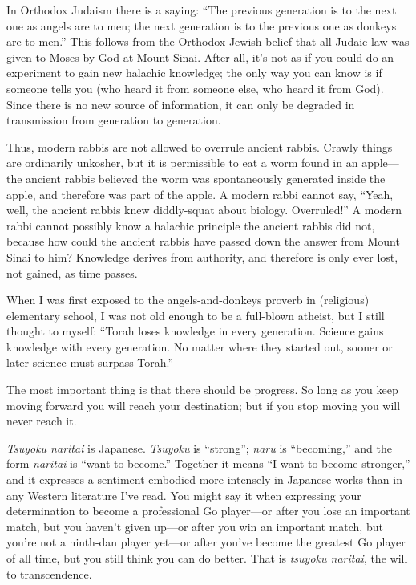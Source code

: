 
{
 In Orthodox Judaism there is a saying: ``The
previous generation is to the next one as angels are to men; the next
generation is to the previous one as donkeys are to
men.'' This follows from the Orthodox Jewish belief
that all Judaic law was given to Moses by God at Mount Sinai. After
all, it's not as if you could do an experiment to gain
new halachic knowledge; the only way you can know is if someone tells
you (who heard it from someone else, who heard it from God). Since
there is no new source of information, it can only be degraded in
transmission from generation to generation. }

{
 Thus, modern rabbis are not allowed to overrule ancient rabbis.
Crawly things are ordinarily unkosher, but it is permissible to eat a
worm found in an apple---the ancient rabbis believed the worm was
spontaneously generated inside the apple, and therefore was part of the
apple. A modern rabbi cannot say, ``Yeah, well, the
ancient rabbis knew diddly-squat about biology.
Overruled!'' A modern rabbi cannot possibly know a
halachic principle the ancient rabbis did not, because how could the
ancient rabbis have passed down the answer from Mount Sinai to him?
Knowledge derives from authority, and therefore is only ever lost, not
gained, as time passes.}

{
 When I was first exposed to the angels-and-donkeys proverb in
(religious) elementary school, I was not old enough to be a full-blown
atheist, but I still thought to myself: ``Torah loses
knowledge in every generation. Science gains knowledge with every
generation. No matter where they started out, sooner or later science
must surpass Torah.''}

{
 The most important thing is that there should be progress. So long
as you keep moving forward you will reach your destination; but if you
stop moving you will never reach it.}

{
 \textit{Tsuyoku naritai} is Japanese. \textit{Tsuyoku} is
``strong''; \textit{naru} is
``becoming,'' and the form
\textit{naritai} is ``want to
become.'' Together it means ``I want
to become stronger,'' and it expresses a sentiment
embodied more intensely in Japanese works than in any Western
literature I've read. You might say it when expressing
your determination to become a professional Go player---or after you
lose an important match, but you haven't given up---or
after you win an important match, but you're not a
ninth-dan player yet---or after you've become the
greatest Go player of all time, but you still think you can do better.
That is \textit{tsuyoku naritai}, the will to transcendence.}

